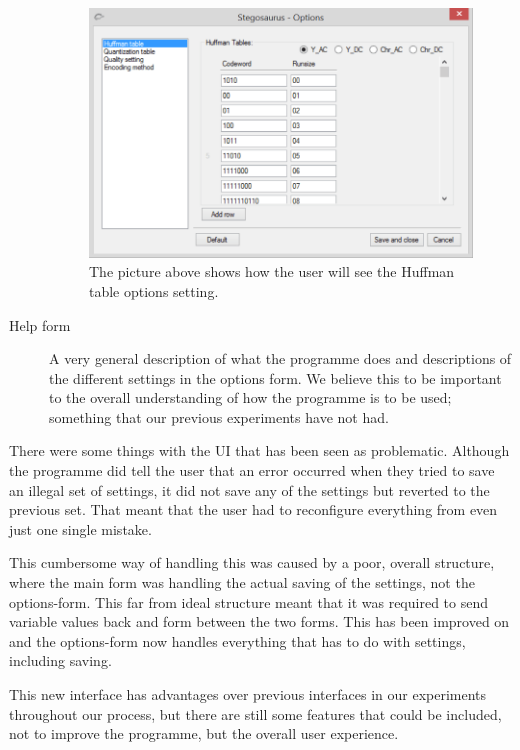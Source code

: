 \begin{description}
\begin{figure}[H]
	\centering
	\includegraphics[width=1\textwidth]{figures/StegoOptionHuff2.png}
	\caption{The picture above shows how the user will see the Huffman table options setting.}
	\label{fig:StegoOptionHuff2}
\end{figure}

\item[Help form]
A very general description of what the programme does and descriptions of the different settings in the options form.
We believe this to be important to the overall understanding of how the programme is to be used; something that our previous experiments have not had.
\end{description}

There were some things with the UI that has been seen as problematic.
Although the programme did tell the user that an error occurred when they tried to save an illegal set of settings, it did not save any of the settings but reverted to the previous set. That meant that the user had to reconfigure everything from even just one single mistake.

This cumbersome way of handling this was caused by a poor, overall structure, where the main form was handling the actual saving of the settings, not the options-form.
This far from ideal structure meant that it was required to send variable values back and form between the two forms.
This has been improved on and the options-form now handles everything that has to do with settings, including saving.

This new interface has advantages over previous interfaces in our experiments throughout our process, but there are still some features that could be included, not to improve the programme, but the overall user experience.
